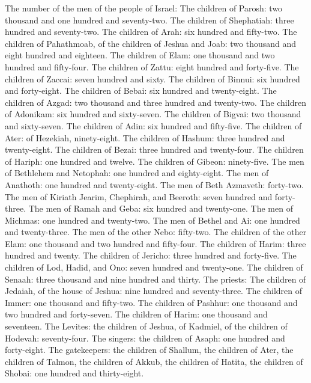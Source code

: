 The number of the men of the people of Israel:  The
children of Parosh: two thousand and one hundred and seventy-two.
 The children of Shephatiah: three hundred and
seventy-two.  The children of Arah: six hundred and
fifty-two.  The children of Pahathmoab, of the children
of Jeshua and Joab: two thousand and eight hundred and eighteen.
 The children of Elam: one thousand and two hundred and
fifty-four.  The children of Zattu: eight hundred and
forty-five.  The children of Zaccai: seven hundred and
sixty.  The children of Binnui: six hundred and
forty-eight.  The children of Bebai: six hundred and
twenty-eight.  The children of Azgad: two thousand and
three hundred and twenty-two.  The children of Adonikam:
six hundred and sixty-seven.  The children of Bigvai: two
thousand and sixty-seven.  The children of Adin: six
hundred and fifty-five.  The children of Ater: of
Hezekiah, ninety-eight.  The children of Hashum: three
hundred and twenty-eight.  The children of Bezai: three
hundred and twenty-four.  The children of Hariph: one
hundred and twelve.  The children of Gibeon: ninety-five.
 The men of Bethlehem and Netophah: one hundred and
eighty-eight.  The men of Anathoth: one hundred and
twenty-eight.  The men of Beth Azmaveth: forty-two.
 The men of Kiriath Jearim, Chephirah, and Beeroth: seven
hundred and forty-three.  The men of Ramah and Geba: six
hundred and twenty-one.  The men of Michmas: one hundred
and twenty-two.  The men of Bethel and Ai: one hundred
and twenty-three.  The men of the other Nebo: fifty-two.
 The children of the other Elam: one thousand and two
hundred and fifty-four.  The children of Harim: three
hundred and twenty.  The children of Jericho: three
hundred and forty-five.  The children of Lod, Hadid, and
Ono: seven hundred and twenty-one.  The children of
Senaah: three thousand and nine hundred and thirty.  The
priests: The children of Jedaiah, of the house of Jeshua: nine hundred
and seventy-three.  The children of Immer: one thousand
and fifty-two.  The children of Pashhur: one thousand and
two hundred and forty-seven.  The children of Harim: one
thousand and seventeen.  The Levites: the children of
Jeshua, of Kadmiel, of the children of Hodevah: seventy-four.
 The singers: the children of Asaph: one hundred and
forty-eight.  The gatekeepers: the children of Shallum,
the children of Ater, the children of Talmon, the children of Akkub, the
children of Hatita, the children of Shobai: one hundred and
thirty-eight.

